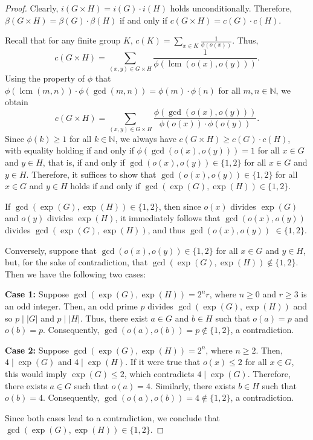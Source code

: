 \documentclass[a4paper,11pt]{amsart}
\numberwithin{equation}{section}
\numberwithin{equation}{subsection}
\begin{document}
\begin{proof}
    Clearly, $i(G\times H) = i(G)\cdot i(H)$ holds unconditionally. Therefore, $\beta(G\times H)=\beta(G)\cdot\beta(H)$ if and only if $c(G\times H)=c(G)\cdot c(H)$. 
    
    Recall that for any finite group $K$, $c(K) = \sum_{x \in K} \frac{1}{\phi(o(x))}$. Thus, 
    $$c(G\times H) = \sum_{(x,y)\in G\times H} \frac{1}{\phi(\operatorname{lcm}(o(x),o(y)))}.$$
    Using the property of $\phi$ that $\phi(\operatorname{lcm}(m,n))\cdot \phi(\operatorname{gcd}(m,n)) =\phi(m)\cdot\phi(n)$ for all $m,n \in \mathbb{N}$, we obtain
    $$c(G\times H) = \sum_{(x,y)\in G\times H} \frac{\phi(\operatorname{gcd}(o(x),o(y)))}{\phi(o(x))\cdot\phi(o(y))}.$$
    Since $\phi(k) \ge 1$ for all $k \in \mathbb{N}$, we always have $c(G\times H) \ge c(G)\cdot c(H)$, with equality holding if and only if $\phi(\operatorname{gcd}(o(x),o(y))) = 1$ for all $x \in G$ and $y \in H$, that is, if and only if $ \operatorname{gcd}(o(x),o(y)) \in \{1,2\}$ for all $x \in G$ and $y \in H$. Therefore, it suffices to show that $ \operatorname{gcd}(o(x),o(y)) \in \{1,2\}$ for all $x \in G$ and $y \in H$ holds if and only if $\operatorname{gcd}(\operatorname{exp}(G),\operatorname{exp}(H)) \in \{1,2\}$. 
    
    If $\operatorname{gcd}(\operatorname{exp}(G),\operatorname{exp}(H)) \in \{1,2\}$, then since $o(x)$ divides $\operatorname{exp}(G)$ and $o(y)$ divides $\operatorname{exp}(H)$, it immediately follows that $\operatorname{gcd}(o(x),o(y))$ divides $\operatorname{gcd}(\operatorname{exp}(G),\operatorname{exp}(H))$, and thus $\operatorname{gcd}(o(x),o(y))$ $\in \{1,2\}$.
    
    Conversely, suppose that $\operatorname{gcd}(o(x), o(y)) \in \{1, 2\}$ for all $x \in G$ and $y \in H$, but, for the sake of contradiction, that $\operatorname{gcd}(\operatorname{exp}(G), \operatorname{exp}(H)) \notin \{1, 2\}$. Then we have the following two cases:
    
    \textbf{Case 1:} Suppose $\operatorname{gcd}(\operatorname{exp}(G), \operatorname{exp}(H)) = 2^n r$, where $n \geq 0$ and $r \geq 3$ is an odd integer.
Then, an odd prime $p$ divides $\operatorname{gcd}(\operatorname{exp}(G), \operatorname{exp}(H))$ and so $p \mid |G|$ and $p \mid |H|$. Thus, there exist $a \in G$ and $b \in H$ such that $o(a) = p$ and $o(b) = p$. Consequently, $\operatorname{gcd}(o(a), o(b)) = p \notin \{1, 2\}$, a contradiction.

    
  \textbf{Case 2:} Suppose $\operatorname{gcd}(\operatorname{exp}(G), \operatorname{exp}(H)) = 2^n$, where $n \geq 2$. Then, $4 \mid \operatorname{exp}(G)$ and $4 \mid \operatorname{exp}(H)$. 
If it were true that $o(x) \leq 2$ for all $x \in G$, this would imply $\operatorname{exp}(G) \leq 2$, which contradicts $4 \mid \operatorname{exp}(G)$. Therefore, there exists $a \in G$ such that $o(a)=4$. Similarly, there exists $b \in H$ such that $o(b)=4$.
Consequently, $\operatorname{gcd}(o(a), o(b)) = 4 \notin \{1, 2\}$, a contradiction.

    
    Since both cases lead to a contradiction, we conclude that $\operatorname{gcd}(\operatorname{exp}(G), \operatorname{exp}(H)) \in \{1, 2\}$.
\end{proof}
\end{document}
